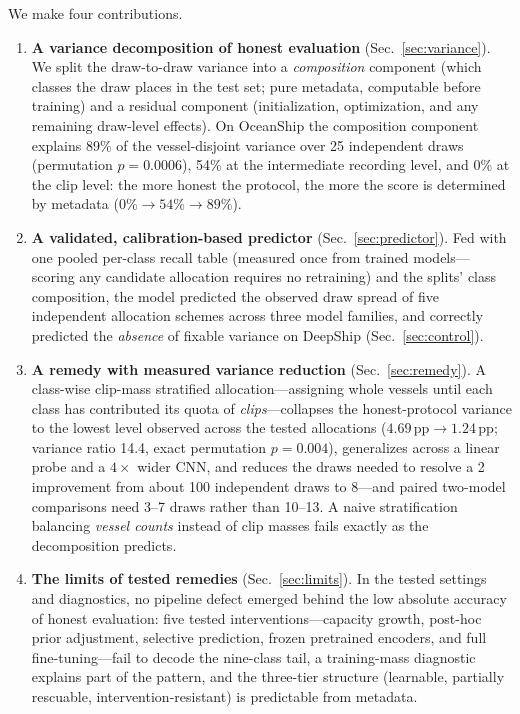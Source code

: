 ﻿\documentclass[journal]{IEEEtran}
\newcommand{\pp}{\,\text{pp}}
\begin{document}
We make four contributions.
\begin{enumerate}
\item \textbf{A variance decomposition of honest evaluation}
      (Sec.~\ref{sec:variance}). We split the draw-to-draw variance into a \emph{composition}
      component (which classes the draw places in the test set; pure metadata, computable before
      training) and a residual component (initialization, optimization, and any remaining
      draw-level effects). On OceanShip the
      composition component explains 89\% of the vessel-disjoint variance over 25 independent
      draws (permutation $p=0.0006$), 54\% at the intermediate
      recording level, and 0\% at the clip level: the more honest the protocol, the more the score
      is determined by metadata ($0\%\!\to\!54\%\!\to\!89\%$).
\item \textbf{A validated, calibration-based predictor} (Sec.~\ref{sec:predictor}). Fed with one pooled
      per-class recall table (measured once from trained models---scoring any candidate allocation
      requires no retraining) and the splits' class composition, the model predicted the observed
      draw spread of five independent allocation schemes across three model families, and correctly
      predicted the \emph{absence} of fixable variance on DeepShip
      (Sec.~\ref{sec:control}).
\item \textbf{A remedy with measured variance reduction} (Sec.~\ref{sec:remedy}). A class-wise
      clip-mass stratified allocation---assigning whole vessels until each class has contributed
      its quota of \emph{clips}---collapses the honest-protocol variance to the lowest level
      observed across the tested allocations ($4.69\pp \to 1.24\pp$; variance ratio 14.4, exact
      permutation $p=0.004$), generalizes across
      a linear probe and a $4\times$ wider CNN, and reduces the draws needed to resolve a 2\pp{}
      improvement from about 100 independent draws to 8---and paired two-model comparisons need
      3--7 draws rather than 10--13. A naive stratification balancing \emph{vessel counts} instead of
      clip masses fails exactly as the decomposition predicts.
\item \textbf{The limits of tested remedies} (Sec.~\ref{sec:limits}). In the tested settings and
      diagnostics, no pipeline defect emerged behind the low absolute accuracy of honest
      evaluation: five tested interventions---capacity growth, post-hoc prior adjustment,
      selective prediction, frozen pretrained encoders, and full
      fine-tuning---fail to decode the nine-class tail, a training-mass diagnostic explains part
      of the pattern, and the three-tier structure
      (learnable, partially rescuable, intervention-resistant) is predictable from metadata.
\end{enumerate}
\end{document}
